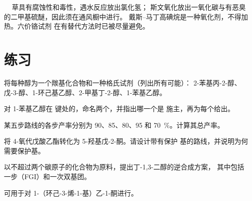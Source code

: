 \begin{safety}{\,\,\,\,\,}
草具有腐蚀性和毒性，遇水反应放出氯化氢；
斯文氧化放出一氧化碳与有恶臭的二甲基硫醚，因此须在通风橱中进行。
戴斯–马丁高碘烷是一种氧化剂，不得加热。六价铬试剂
在有替代方法时已被尽量避免。
\end{safety}

\section{练习}

\begin{exercise}[$\star$]\label{exo:b2:retrosynthesis:1}
将每种醇为一个羰基化合物和一种格氏试剂（列出所有可能）：
2-苯基丙-2-醇、戊-3-醇、1-环己基乙醇、2-甲基丁-2-醇、1-苯基乙醇。
\end{exercise}

\begin{exercise}[$\star$]\label{exo:b2:retrosynthesis:2}
对 1-苯基乙醇在  键处的，命名两个，并指出哪一个是
施主，再为每个给出。
\end{exercise}

\begin{exercise}[$\star$]\label{exo:b2:retrosynthesis:3}
某五步路线的各步产率分别为 90、85、80、95 和 70~\%。计算其总产率。
\end{exercise}

\begin{exercise}[$\star$]\label{exo:b2:retrosynthesis:4}
将 4-氧代戊酸乙酯转化为 5-羟基戊-2-酮。请设计带有保护
基的路线，并说明为何需要保护基。
\end{exercise}

\begin{exercise}[$\star\star$]\label{exo:b2:retrosynthesis:5}
以不超过两个碳原子的化合物为原料，提出丁-1,3-二醇的逆合成方案，
其中包括一步（FGI）和一次双基团。
\end{exercise}

\begin{exercise}[$\star\star$]\label{exo:b2:retrosynthesis:6}
可用于对 1-（环己-3-烯-1-基）乙-1-酮进行。
\end{exercise}

